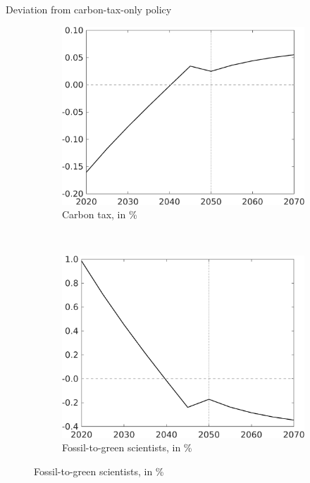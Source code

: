 \documentclass[11pt,aspectratio=169]{beamer}
\begin{document}
\begin{frame}{Deviation from carbon-tax-only policy}
\pause
\centering
\begin{figure}
	\begin{subfigure}{0.4\textwidth}
		\caption{\normalsize{Carbon tax, in \%}}
		\includegraphics[width=1\textwidth]{../codding_model/own_basedOnFried/optimalPol_010922_revision/figures/all_13Sept22_Tplus30/Tauf_OPT_T_NoTaus_COMPtaulPer_regime4_spillover0_knspil0_noskill0_sep0_xgrowth0_PV1_etaa0.79.png}
	\end{subfigure}
	\begin{minipage}[]{0.1\textwidth}
		\
	\end{minipage}
	\begin{subfigure}{0.4\textwidth}
		\caption{\normalsize{Fossil-to-green scientists,  in \% }}
		\includegraphics[width=1\textwidth]{../codding_model/own_basedOnFried/optimalPol_010922_revision/figures/all_13Sept22_Tplus30/sffsg_OPT_T_NoTaus_COMPtaulPer_regime4_spillover0_knspil0_noskill0_sep0_xgrowth0_PV1_etaa0.79.png}

\end{subfigure}
\end{figure}
\end{frame}
\end{document}
